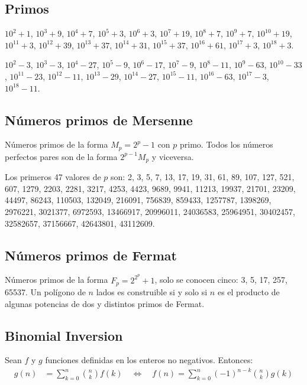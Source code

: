 	\subsection{Primos}
		$10^2+1$, $10^3+9$, $10^4+7$, $10^5+3$, $10^6+3$, $10^7+19$, $10^8+7$, $10^9+7$, $10^{10}+19$, $10^{11}+3$, $10^{12}+39$, $10^{13}+37$, $10^{14}+31$, $10^{15}+37$, $10^{16}+61$, $10^{17}+3$, $10^{18}+3$.
		
		$10^2-3$, $10^3-3$, $10^4-27$, $10^5-9$, $10^6-17$, $10^7-9$, $10^8-11$, $10^9-63$, $10^{10}-33$, $10^{11}-23$, $10^{12}-11$, $10^{13}-29$, $10^{14}-27$, $10^{15}-11$, $10^{16}-63$, $10^{17}-3$, $10^{18}-11$.
	
	\subsection{Números primos de Mersenne}
		Números primos de la forma $M_p=2^p-1$ con $p$ primo. Todos los números perfectos pares son de la forma $2^{p-1}M_p$ y viceversa.
	
		Los primeros 47 valores de $p$ son: 2, 3, 5, 7, 13, 17, 19, 31, 61, 89, 107, 127, 521, 607, 1279, 2203, 2281, 3217, 4253, 4423, 9689, 9941, 11213, 19937, 21701, 23209, 44497, 86243, 110503, 132049, 216091, 756839, 859433, 1257787, 1398269, 2976221, 3021377, 6972593, 13466917, 20996011, 24036583, 25964951, 30402457, 32582657, 37156667, 42643801, 43112609.
	
	\subsection{Números primos de Fermat}
		Números primos de la forma $F_p=2^{2^p}+1$, solo se conocen cinco: 3, 5, 17, 257, 65537. Un polígono de $n$ lados es construible si y solo si $n$ es el producto de algunas potencias de dos y distintos primos de Fermat.
	
	\subsection{Binomial Inversion}
		Sean $f$ y $g$ funciones definidas en los enteros no negativos. Entonces:
		\begin{align*}
			g(n) &= \sum_{k=0}^{n} \binom{n}{k} f(k) \quad \iff \quad f(n) = \sum_{k=0}^{n} (-1)^{n-k} \binom{n}{k} g(k)
		\end{align*}